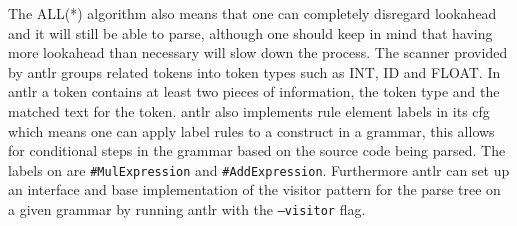 The ALL(*) algorithm also means that one can completely disregard lookahead and it will still be able to parse, although one should keep in mind that having more lookahead than necessary will slow down the process.
The scanner provided by \acrshort{antlr} groups related tokens into token types such as INT, ID and FLOAT.
In \acrshort{antlr} a token contains at least two pieces of information, the token type and the matched text for the token.
\acrshort{antlr} also implements rule element labels in its \acrfull{cfg} which means one can apply label rules to a construct in a grammar, this allows for conditional steps in the grammar based on the source code being parsed.
The labels on  are \texttt{\#MulExpression} and \texttt{\#AddExpression}.
Furthermore \acrshort{antlr} can set up an interface and base implementation of the visitor pattern for the parse tree on a given grammar by running \acrshort{antlr} with the \texttt{--visitor} flag.\citep{ALLSTAR, LLSTAR, antlr4_Book}



